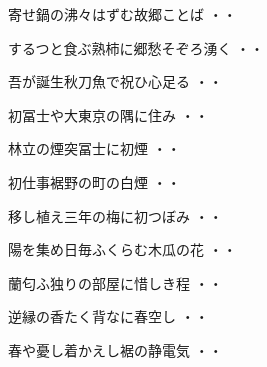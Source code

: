 \vspace{0.6cm}
\begin{shiika}寄せ鍋の沸々はずむ故郷ことば
\hfill{・・}\end{shiika}
\vspace{0.6cm}
\begin{shiika}するつと食ぶ熟柿に郷愁そぞろ湧く
\hfill{・・}\end{shiika}
\vspace{0.6cm}
\begin{shiika}吾が誕生秋刀魚で祝ひ心足る
\hfill{・・}\end{shiika}
\vspace{0.6cm}
\begin{shiika}初冨士や大東京の隅に住み
\hfill{・・}\end{shiika}
\vspace{0.6cm}
\begin{shiika}林立の煙突冨士に初煙
\hfill{・・}\end{shiika}
\vspace{0.6cm}
\begin{shiika}初仕事裾野の町の白煙
\hfill{・・}\end{shiika}
\vspace{0.6cm}
\begin{shiika}移し植え三年の梅に初つぼみ
\hfill{・・}\end{shiika}
\vspace{0.6cm}
\begin{shiika}陽を集め日毎ふくらむ木瓜の花
\hfill{・・}\end{shiika}
\vspace{0.6cm}
\begin{shiika}蘭匂ふ独りの部屋に惜しき程
\hfill{・・}\end{shiika}
\vspace{0.6cm}
\begin{shiika}逆縁の香たく背なに春空し
\hfill{・・}\end{shiika}
\vspace{0.6cm}
\begin{shiika}春や憂し着かえし裾の静電気
\hfill{・・}\end{shiika}
